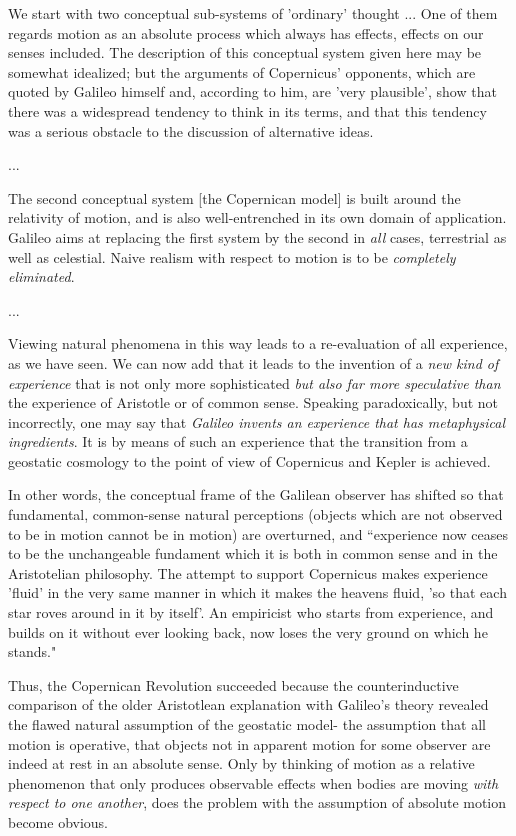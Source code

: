 \begin{longquote}
We start with two conceptual sub-systems of 'ordinary' thought ... One of them regards motion as an absolute process which always has effects, effects on our senses included.
The description of this conceptual system given here may be somewhat
idealized; but the arguments of Copernicus' opponents, which are
quoted by Galileo himself and, according to him, are 'very
plausible', show that there was a widespread tendency to think in its
terms, and that this tendency was a serious obstacle to the discussion
of alternative ideas.

...

The second conceptual system [the Copernican model] is built around the relativity of
motion, and is also well-entrenched in its own domain of application.
Galileo aims at replacing the first system by the second in \textit{all} cases,
terrestrial as well as celestial. Naive realism with respect to motion is
to be \textit{completely eliminated}.

...

Viewing natural phenomena in this way leads to a re-evaluation of all
experience, as we have seen. We can now add that it leads to the
invention of a \textit{new kind of experience} that is not only more sophisticated
\textit{but also far more speculative than} the experience of Aristotle or of
common sense. Speaking paradoxically, but not incorrectly, one may
say that \textit{Galileo invents an experience that has metaphysical ingredients}. It
is by means of such an experience that the transition from a geostatic
cosmology to the point of view of Copernicus and Kepler is
achieved.

\cite[p.69]{Feyerabend1993}
\end{longquote}

In other words, the conceptual frame of the Galilean observer has shifted so that fundamental, common-sense natural perceptions (objects which are not observed to be in motion cannot be in motion) are overturned, and ``experience now ceases to be the unchangeable fundament which it is both in common sense and in the Aristotelian philosophy.
The attempt to support Copernicus makes experience 'fluid' in the
very same manner in which it makes the heavens fluid, 'so that each
star roves around in it by itself'. An empiricist who starts from
experience, and builds on it without ever looking back, now loses the
very ground on which he stands." \cite[p.72]{Feyerabend1993}

Thus, the Copernican Revolution succeeded because the counterinductive comparison of the older Aristotlean explanation with Galileo's theory revealed the flawed natural assumption of the geostatic model- the assumption that all motion is operative, that objects not in apparent motion for some observer are indeed at rest in an absolute sense. Only by thinking of motion as a relative phenomenon that only produces observable effects when bodies are moving \textit{with respect to one another}, does the problem with the assumption of absolute motion become obvious.

